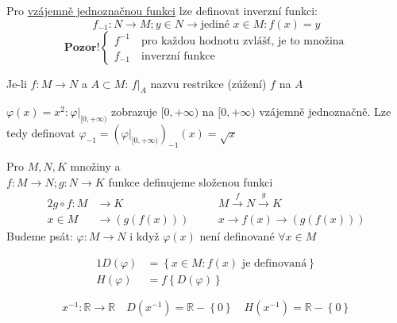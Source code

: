 Pro \hyperref[D-bijection]{vzájemně jednoznačnou funkci} lze definovat inverzní funkci:
\begin{equation}
    f_{-1}:N\rightarrow M; y\in N\rightarrow \text{jediné }x\in M: f(x)=y
\end{equation}
\[
\textbf{Pozor!}
\begin{cases}
    f^{-1} \quad\text{pro každou hodnotu zvlášť, je to množina} \\
    f_{-1} \quad\text{inverzní funkce}
\end{cases}
\]

\begin{definition}
    Je-li $f:M\rightarrow N$ a $A\subset M$: $f|_A$ nazvu restrikce (zúžení) $f$ na $A$
\end{definition}
\begin{example}
    $\varphi(x)=x^2: \varphi|_{[0,+\infty)}$ zobrazuje $[0,+\infty)$ na $[0,+\infty)$
    vzájemně jednoznačně. Lze tedy definovat $\varphi_{-1}=(\varphi|_{[0,+\infty)})_{-1}(x)=\sqrt{x}$
\end{example}    
        
\begin{definition}
    Pro $M,N,K$ množiny a \\$f:M\rightarrow N; g:N\rightarrow K$ funkce definujeme složenou funkci
    \begin{alignat}{2}
        g\circ f: M&\rightarrow K &&\quad M\xrightarrow{f}N\xrightarrow{g}K \\
        x\in M &\rightarrow \left(g(f(x))\right) &&\quad x\rightarrow f(x)\rightarrow\left(g(f(x))\right)
    \end{alignat}
    Budeme psát: $\varphi :M\rightarrow N$ i když $\varphi(x)$ není definované $\forall x\in M$
\end{definition}

\begin{definition}
    \begin{alignat}{1}
        D(\varphi)&=\left\{x\in M: f(x) \text{ je definovaná}\right\} \\
        H(\varphi)&=f\left\{D(\varphi)\right\}
    \end{alignat}
\end{definition}
\begin{example}
    \begin{equation*}
        x^{-1}: \mathbb{R}\rightarrow\mathbb{R} \quad
            D\left(x^{-1}\right)=\mathbb{R}-\left\{0\right\} \quad
            H\left(x^{-1}\right)=\mathbb{R}-\left\{0\right\}
    \end{equation*}
\end{example}

